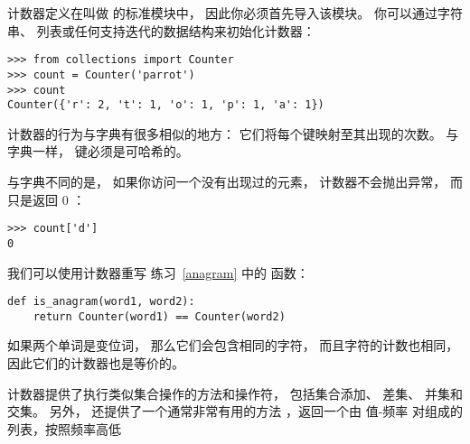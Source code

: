 计数器定义在叫做  的标准模块中， 因此你必须首先导入该模块。  
你可以通过字符串、 列表或任何支持迭代的数据结构来初始化计数器：

\begin{lstlisting}
>>> from collections import Counter
>>> count = Counter('parrot')
>>> count
Counter({'r': 2, 't': 1, 'o': 1, 'p': 1, 'a': 1})
\end{lstlisting}


计数器的行为与字典有很多相似的地方： 它们将每个键映射至其出现的次数。  
与字典一样， 键必须是可哈希的。


与字典不同的是， 如果你访问一个没有出现过的元素， 计数器不会抛出异常， 而只是返回 0 ：

\begin{lstlisting}
>>> count['d']
0
\end{lstlisting}


我们可以使用计数器重写 练习~\ref{anagram} 中的  函数：

\begin{lstlisting}
def is_anagram(word1, word2):
    return Counter(word1) == Counter(word2)
\end{lstlisting}


如果两个单词是变位词， 那么它们会包含相同的字符， 而且字符的计数也相同， 因此它们的计数器也是等价的。


计数器提供了执行类似集合操作的方法和操作符， 包括集合添加、 差集、 并集和交集。  
另外， 还提供了一个通常非常有用的方法  ，返回一个由 值-频率 对组成的列表，按照频率高低

